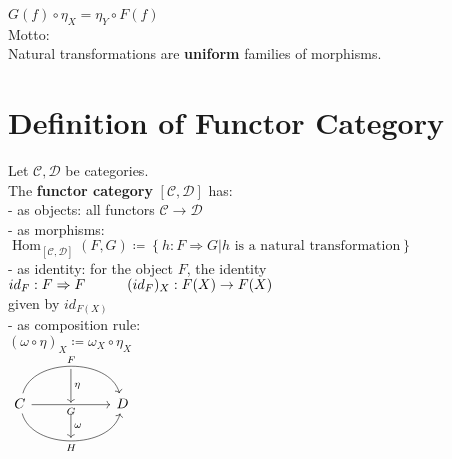 \documentclass[a4paper, twoside, english, 11pt]{book}
\newcommand{\braces}[1] {\left \{ #1 \right \}}
\DeclareMathOperator{\Hom}{Hom}
\newcommand{\C}{\mathcal C}
\newcommand{\D}{\mathcal D}
\begin{document}
$G(f) \circ \eta_X = \eta_Y \circ F(f)$ \\

\noindent
Motto: \\
Natural transformations are \textbf{uniform} families of morphisms.



\section{Definition of Functor Category}

Let $\C, \D$ be categories. \\
The \textbf{functor category} $[\C, \D]$ has: \\

- as objects: all functors $\C \rightarrow \D$ \\

- as morphisms: $\Hom_{[\C, \D]}(F, G) \coloneqq \braces{h : F \Rightarrow G | h \text{ is a natural transformation}}$ \\

- as identity: for the object $F$, the identity $id_F : F \Rightarrow F \\
\indent\indent
(id_F)_X : F(X) \rightarrow F(X)$ \\
\indent\indent
given by $id_{F(X)}$ \\

- as composition rule: \\
\indent\indent
$(\omega \circ \eta)_X \coloneqq \omega_X \circ \eta_X$ \\

$\begin{tikzcd}
                                                                                 & {} \arrow[d, "\eta"]   &   \\
C \arrow[rr, "F", bend left=75] \arrow[rr, "H"', bend right=75] \arrow[rr, "G"'] & {} \arrow[d, "\omega"] & D \\
                                                                                 & {}                     &
\end{tikzcd}$ \\
\end{document}
